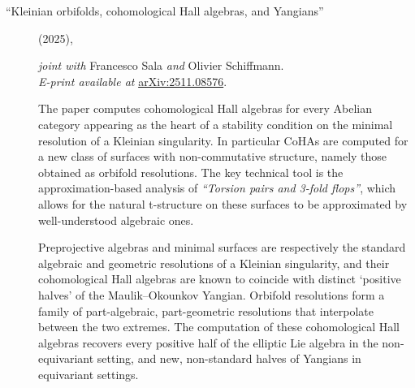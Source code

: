 \documentclass[10pt]{article}
\begin{document}
\begin{description}
	\item[``Kleinian orbifolds, cohomological Hall algebras, and Yangians'']
	      (2025),

	      \emph{joint with} Francesco Sala \emph{and} Olivier Schiffmann.\\
	      \emph{E-print available at}
	      \href{https://arxiv.org/abs/2511.08576}{arXiv:2511.08576}.

	      The paper computes cohomological Hall algebras for every Abelian category
	      appearing as the heart of a stability condition on the minimal
          resolution of a Kleinian singularity. In particular CoHAs are computed
          for a new class of surfaces with non-commutative structure, namely
          those obtained as orbifold resolutions. The key technical tool is the
          approximation-based analysis of \emph{``Torsion pairs and 3-fold
          flops''}, which allows for the natural t-structure on these surfaces
          to be approximated by well-understood algebraic ones.

	      Preprojective algebras and minimal surfaces are respectively the standard
	      algebraic and geometric resolutions of a Kleinian singularity, and their
	      cohomological Hall algebras are known to coincide with distinct `positive
	      halves' of the Maulik--Okounkov Yangian. Orbifold resolutions form a
          family of part-algebraic, part-geometric resolutions that interpolate
          between the two extremes. The computation of these cohomological Hall
          algebras recovers every positive half of the elliptic Lie algebra in
          the non-equivariant setting, and new, non-standard halves of Yangians
          in equivariant settings.

\end{description}
\end{document}
